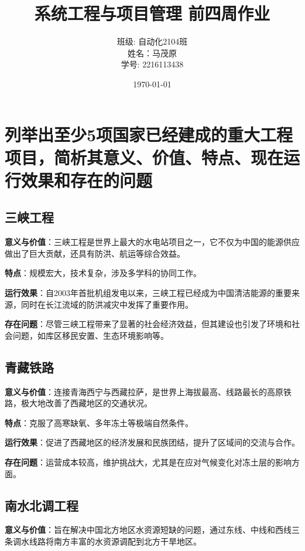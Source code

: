 \documentclass[UTF8,a4paper]{ctexart}
\begin{document}
	\title{\Huge 系统工程与项目管理 前四周作业}
	\author{
		\Large 班级: 自动化2104班 \\
		\Large 姓名：马茂原 \\
		\Large 学号: 2216113438
	}
	\date{\today}
	\maketitle
	
	\newpage

	\tableofcontents
	\newpage
	
	\setcounter{page}{1} %

		
	\section{列举出至少5项国家已经建成的重大工程项目，简析其意义、价值、特点、现在运行效果和存在的问题}
	
	\subsection{三峡工程}
	\textbf{意义与价值}：三峡工程是世界上最大的水电站项目之一，它不仅为中国的能源供应做出了巨大贡献，还具有防洪、航运等综合效益。
	
	\textbf{特点}：规模宏大，技术复杂，涉及多学科的协同工作。
	
	\textbf{运行效果}：自2003年首批机组发电以来，三峡工程已经成为中国清洁能源的重要来源，同时在长江流域的防洪减灾中发挥了重要作用。
	
	\textbf{存在问题}：尽管三峡工程带来了显著的社会经济效益，但其建设也引发了环境和社会问题，如库区移民安置、生态环境影响等。
	
		
	\subsection{青藏铁路}
	\textbf{意义与价值}：连接青海西宁与西藏拉萨，是世界上海拔最高、线路最长的高原铁路，极大地改善了西藏地区的交通状况。
	
	\textbf{特点}：克服了高寒缺氧、多年冻土等极端自然条件。
	
	\textbf{运行效果}：促进了西藏地区的经济发展和民族团结，提升了区域间的交流与合作。
	
	\textbf{存在问题}：运营成本较高，维护挑战大，尤其是在应对气候变化对冻土层的影响方面。
	
	\subsection{南水北调工程}
	\textbf{意义与价值}：旨在解决中国北方地区水资源短缺的问题，通过东线、中线和西线三条调水线路将南方丰富的水资源调配到北方干旱地区。
	
\end{document}
